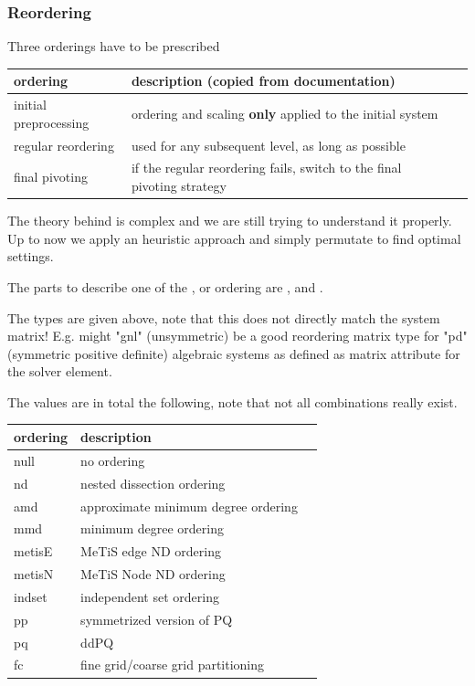 \subsubsection*{Reordering}
Three orderings have to be prescribed
\begin{center}
\begin{tabular}{llp{}}
\toprule
ordering & description (copied from documentation) \\
\midrule
initial preprocessing & ordering and scaling \textbf{only} applied to the
initial system \\
regular reordering & used for any subsequent level, as long as possible \\
final pivoting & if the regular reordering fails, switch to the final pivoting
strategy \\
\bottomrule
\end{tabular}
\end{center}
The theory behind is complex and we are still trying to understand it properly.
Up to now we apply an heuristic approach and simply permutate
to find optimal settings. 

The parts to describe one of the ,  or
 ordering are ,  and
.

The  types are given above, note that this does not directly match
the system matrix! E.g. might "gnl" (unsymmetric) be a good reordering matrix
type for "pd" (symmetric positive definite) algebraic systems as defined as
matrix attribute for the solver element.

The  values are in total the following, note that not all
combinations really exist.
\begin{center}
\begin{tabular}{llp{}}
\toprule
ordering & description \\
\midrule
null & no ordering\\
nd & nested dissection ordering\\
amd & approximate minimum degree ordering\\
mmd & minimum degree ordering\\
metisE & MeTiS edge ND ordering\\
metisN & MeTiS Node ND ordering\\
indset & independent set ordering\\
pp & symmetrized version of PQ\\
pq & ddPQ\\
fc & fine grid/coarse grid partitioning\\
\bottomrule
\end{tabular}
\end{center}

